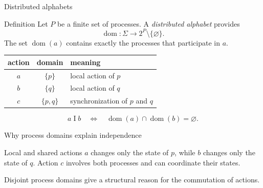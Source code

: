 \documentclass[t,11pt]{beamer}
\newcommand{\domn}{\operatorname{dom}}
\newcommand{\ind}{\mathrel{I}}
\begin{document}
\begin{frame}{Distributed alphabets}
  \begin{block}{Definition}
    Let $P$ be a finite set of processes. A \emph{distributed alphabet} provides
    \[
       \domn:\Sigma\longrightarrow 2^P\setminus\{\varnothing\}.
    \]
    The set $\domn(a)$ contains exactly the processes that participate in $a$.
  \end{block}
  \begin{center}
    \begin{tabular}{c|c|l}
      action & domain & meaning\\ \hline
      $a$ & $\{p\}$ & local action of $p$\\
      $b$ & $\{q\}$ & local action of $q$\\
      $c$ & $\{p,q\}$ & synchronization of $p$ and $q$
    \end{tabular}
  \end{center}
  \[
      a\ind b\quad\Longleftrightarrow\quad \domn(a)\cap\domn(b)=\varnothing.
  \]
\end{frame}

\begin{frame}{Why process domains explain independence}
  \begin{center}
  \end{center}
  \begin{block}{Local and shared actions}
    $a$ changes only the state of $p$, while $b$ changes only the state of $q$. Action $c$ involves both processes and can coordinate their states.
  \end{block}
  \vspace{0.15cm}
  Disjoint process domains give a structural reason for the commutation of actions.
\end{frame}
\end{document}
